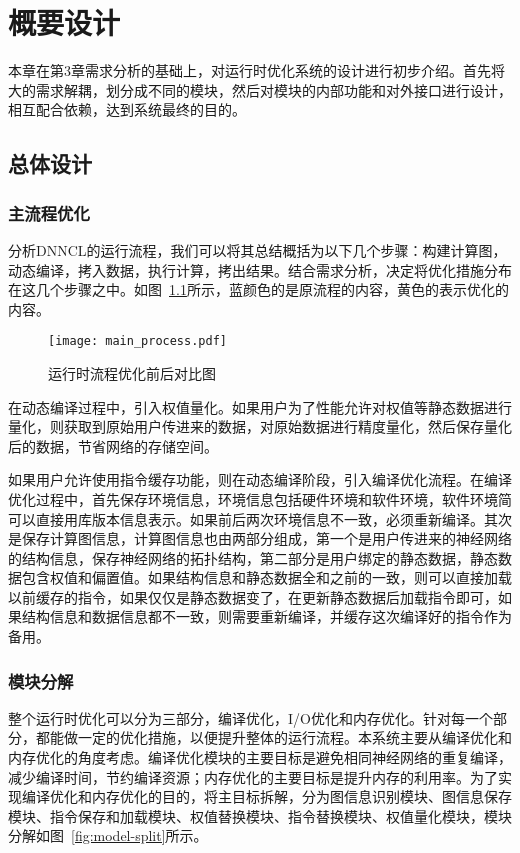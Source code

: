 
\chapter{概要设计}
本章在第3章需求分析的基础上，对运行时优化系统的设计进行初步介绍。首先将大的需求解耦，划分成不同的模块，然后对模块的内部功能和对外接口进行设计，相互配合依赖，达到系统最终的目的。

\section {总体设计}
\subsection {主流程优化}
分析DNNCL的运行流程，我们可以将其总结概括为以下几个步骤：构建计算图，动态编译，拷入数据，执行计算，拷出结果。结合需求分析，决定将优化措施分布在这几个步骤之中。如图~\ref{fig:main-process}所示，蓝颜色的是原流程的内容，黄色的表示优化的内容。

\begin{figure}[htb]
  \centering
  \texttt{[image: main\_process.pdf]}
  \caption{运行时流程优化前后对比图}
  \label{fig:main-process}
\end{figure}

在动态编译过程中，引入权值量化。如果用户为了性能允许对权值等静态数据进行量化，则获取到原始用户传进来的数据，对原始数据进行精度量化，然后保存量化后的数据，节省网络的存储空间。

如果用户允许使用指令缓存功能，则在动态编译阶段，引入编译优化流程。在编译优化过程中，首先保存环境信息，环境信息包括硬件环境和软件环境，软件环境简可以直接用库版本信息表示。如果前后两次环境信息不一致，必须重新编译。其次是保存计算图信息，计算图信息也由两部分组成，第一个是用户传进来的神经网络的结构信息，保存神经网络的拓扑结构，第二部分是用户绑定的静态数据，静态数据包含权值和偏置值。如果结构信息和静态数据全和之前的一致，则可以直接加载以前缓存的指令，如果仅仅是静态数据变了，在更新静态数据后加载指令即可，如果结构信息和数据信息都不一致，则需要重新编译，并缓存这次编译好的指令作为备用。

\subsection {模块分解}
整个运行时优化可以分为三部分，编译优化，I/O优化和内存优化。针对每一个部分，都能做一定的优化措施，以便提升整体的运行流程。本系统主要从编译优化和内存优化的角度考虑。编译优化模块的主要目标是避免相同神经网络的重复编译，减少编译时间，节约编译资源；内存优化的主要目标是提升内存的利用率。为了实现编译优化和内存优化的目的，将主目标拆解，分为图信息识别模块、图信息保存模块、指令保存和加载模块、权值替换模块、指令替换模块、权值量化模块，模块分解如图~\ref{fig:model-split}所示。

